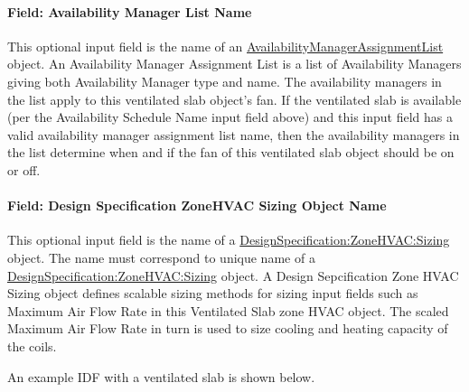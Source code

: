 \paragraph{Field: Availability Manager List Name}\label{field-availability-manager-list-name-001}

This optional input field is the name of an \hyperref[availabilitymanagerassignmentlist]{AvailabilityManagerAssignmentList} object. An Availability Manager Assignment List is a list of Availability Managers giving both Availability Manager type and name. The availability managers in the list apply to this ventilated slab object's fan. If the ventilated slab is available (per the Availability Schedule Name input field above) and this input field has a valid availability manager assignment list name, then the availability managers in the list determine when and if the fan of this ventilated slab object should be on or off.

\paragraph{Field: Design Specification ZoneHVAC Sizing Object Name}\label{field-design-specification-zonehvac-sizing-object-name}

This optional input field is the name of a \hyperref[designspecificationzonehvacsizing]{DesignSpecification:ZoneHVAC:Sizing} object. The name must correspond to unique name of a \hyperref[designspecificationzonehvacsizing]{DesignSpecification:ZoneHVAC:Sizing} object. A Design Sepcification Zone HVAC Sizing object defines scalable sizing methods for sizing input fields such as Maximum Air Flow Rate in this Ventilated Slab zone HVAC object. The scaled Maximum Air Flow Rate in turn is used to size cooling and heating capacity of the coils.

An example IDF with a ventilated slab is shown below.


